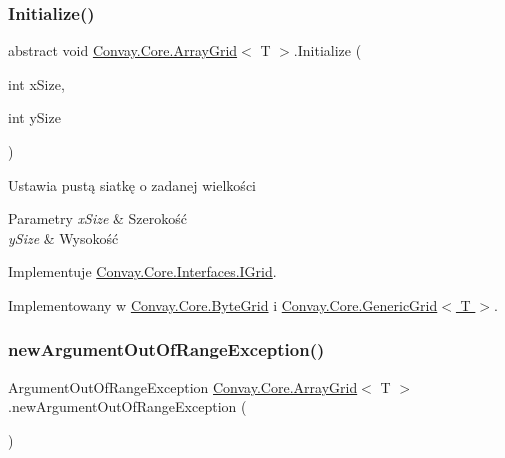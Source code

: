 \subsubsection{\texorpdfstring{Initialize()}{Initialize()}}
{\footnotesize\ttfamily abstract void \hyperlink{class_convay_1_1_core_1_1_array_grid}{Convay.\+Core.\+Array\+Grid}$<$ T $>$.Initialize (\begin{DoxyParamCaption}\item[{int}]{x\+Size,  }\item[{int}]{y\+Size }\end{DoxyParamCaption})\hspace{0.3cm}{\ttfamily [pure virtual]}}



Ustawia pustą siatkę o zadanej wielkości 


\begin{DoxyParams}{Parametry}
{\em x\+Size} & Szerokość\\
\hline
{\em y\+Size} & Wysokość\\
\hline
\end{DoxyParams}


Implementuje \hyperlink{interface_convay_1_1_core_1_1_interfaces_1_1_i_grid_a405c8dd71debf227ef90365d7fdf52b2}{Convay.\+Core.\+Interfaces.\+I\+Grid}.



Implementowany w \hyperlink{class_convay_1_1_core_1_1_byte_grid_a75128576734ebd27f9b469ed0f7aaeee}{Convay.\+Core.\+Byte\+Grid} i \hyperlink{class_convay_1_1_core_1_1_generic_grid_a5d39ff67bb67b6a70455ecd61fc1a0ef}{Convay.\+Core.\+Generic\+Grid$<$ T $>$}.

\hypertarget{class_convay_1_1_core_1_1_array_grid_a3d6803d7c51929e3a26c57a7f0dc87e1}{}\label{class_convay_1_1_core_1_1_array_grid_a3d6803d7c51929e3a26c57a7f0dc87e1} 
\subsubsection{\texorpdfstring{new\+Argument\+Out\+Of\+Range\+Exception()}{newArgumentOutOfRangeException()}}
{\footnotesize\ttfamily Argument\+Out\+Of\+Range\+Exception \hyperlink{class_convay_1_1_core_1_1_array_grid}{Convay.\+Core.\+Array\+Grid}$<$ T $>$.new\+Argument\+Out\+Of\+Range\+Exception (\begin{DoxyParamCaption}{ }\end{DoxyParamCaption})\hspace{0.3cm}{\ttfamily [protected]}}



